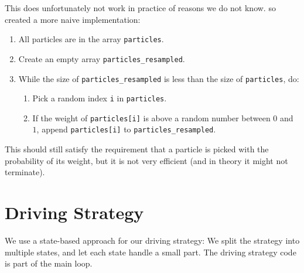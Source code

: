\documentclass[a4paper,12pt]{article}
\begin{document}
This does unfortunately not work in practice of reasons we do not know. so created a more naive implementation: 

\begin{enumerate}
\item All particles are in the array \texttt{particles}.
\item Create an empty array \texttt{particles_resampled}.
\item While the size of \texttt{particles_resampled} is less than the size of
\texttt{particles}, do:
\begin{enumerate}
\item Pick a random index \texttt{i} in \texttt{particles}.
\item If the weight of \texttt{particles[i]} is above a random number between
$0$ and $1$, append \texttt{particles[i]} to \texttt{particles_resampled}.
\end{enumerate}
\end{enumerate}

This should still satisfy the requirement that a particle is picked with the
probability of its weight, but it is not very efficient (and in theory it might
not terminate).


\section{Driving Strategy}

We use a state-based approach for our driving strategy: We split the strategy
into multiple states, and let each state handle a small part.  The driving
strategy code is part of the main loop.
\end{document}
